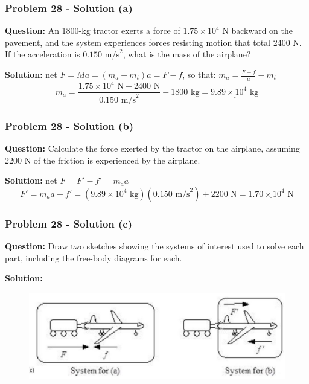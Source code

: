 \documentclass{beamer}
\begin{document}
\begin{}
\begin{frame}
\frametitle{Problem 28 - Solution (a)}
\textbf{Question:} An 1800-kg tractor exerts a force of $1.75 \times 10^{4} \text{ N}$ backward on the pavement, and the system experiences forces resisting motion that total 2400 N. If the acceleration is $0.150 \text{ m/s}^{2}$, what is the mass of the airplane?

\vspace{0.5cm}

\textbf{Solution:}
net $F = Ma = (m_a + m_t)a = F - f$, so that: $m_a = \frac{F - f}{a} - m_t$
\begin{equation*}
m_a = \frac{1.75 \times 10^{4} \text{ N} - 2400 \text{ N}}{0.150 \text{ m/s}^{2}} - 1800 \text{ kg} = \underline{9.89 \times 10^{4} \text{ kg}}
\end{equation*}
\end{frame}

\begin{frame}
\frametitle{Problem 28 - Solution (b)}
\textbf{Question:} Calculate the force exerted by the tractor on the airplane, assuming 2200 N of the friction is experienced by the airplane.

\vspace{0.5cm}

\textbf{Solution:}
net $F = F' - f' = m_a a$
\begin{equation*}
F' = m_a a + f' = (9.89 \times 10^{4} \text{ kg})(0.150 \text{ m/s}^{2}) + 2200 \text{ N} = \underline{1.70 \times 10^{4} \text{ N}}
\end{equation*}
\end{frame}

\begin{frame}
\frametitle{Problem 28 - Solution (c)}
\textbf{Question:} Draw two sketches showing the systems of interest used to solve each part, including the free-body diagrams for each.

\vspace{0.5cm}

\textbf{Solution:}

\begin{figure}
    \centering
    \includegraphics[width=0.5\linewidth]{CH4/Screenshot 2024-10-18 111935.png}
\end{figure}
\end{frame}


\end{}
\end{document}
